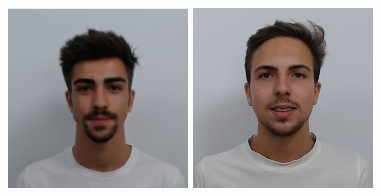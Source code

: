 \documentclass[11t]{article}
\begin{document}
\begin{titlepage}
\begin{center}
    \begin{figure}[!htb]
            \includegraphics[width=\linewidth]{images/137.jpg} 
            \centering
            \captionsetup{PG47068}
        \endminipage
        \hspace{0,2cm}
            \includegraphics[width=\linewidth]{images/50.jpeg} 

\end{figure}
\end{center}
\end{titlepage}
\end{document}
